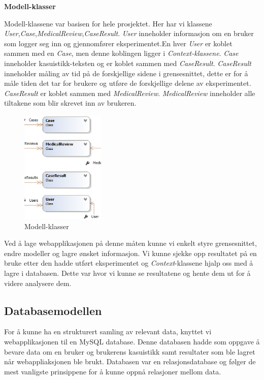 \textbf{Modell-klasser} 

Modell-klassene var basisen for hele prosjektet. Her har vi klassene \textit{User},\textit{Case},\textit{MedicalReview},\textit{CaseResult}. \textit{User} inneholder informasjon om en bruker som logger seg inn og gjennomfører eksperimentet.En hver \textit{User} er koblet sammen med en \textit{Case}, men denne koblingen ligger i \textit{Context-klassene}. \textit{Case} inneholder kasuistikk-teksten og er koblet sammen med \textit{CaseResult}. \textit{CaseResult} inneholder måling av tid på de forskjellige sidene i grensesnittet, dette er for å måle tiden det tar for brukere og utføre de forskjellige delene av eksperimentet. \textit{CaseResult} er koblet sammen med \textit{MedicalReview}. \textit{MedicalReview} inneholder alle tiltakene som blir skrevet inn av brukeren. \\
\begin{figure}[H]
\centering
\includegraphics[width=4cm]{images/Models.png}
\caption{Modell-klasser}
\label{fig:models}
\end{figure}
Ved å lage webapplikasjonen på denne måten kunne vi enkelt styre grensesnittet, endre modeller og lagre ønsket informasjon. Vi kunne sjekke opp resultatet på en bruke etter den hadde utført eksperimentet og \textit{Context}-klassene hjalp oss med å lagre i databasen. Dette var hvor vi kunne se resultatene og hente dem ut for å videre analysere dem.


\subsection{Databasemodellen}
For å kunne ha en strukturert samling av relevant data, knyttet vi webapplikasjonen til en MySQL database. Denne databasen hadde som oppgave å bevare data om en bruker og brukerens kasuistikk samt resultater som ble lagret når webappliaksjonen ble brukt. Databasen var en relasjonsdatabase og følger de mest vanligste prinsippene for å kunne oppnå relasjoner mellom data. \\

